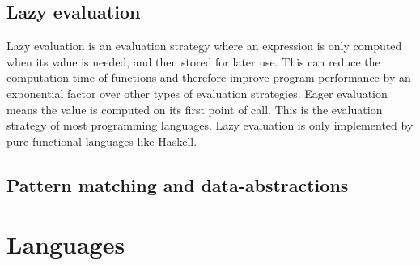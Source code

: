 \subsection{Lazy evaluation}
Lazy evaluation is an evaluation strategy where an expression is only computed when its value is needed, and
then stored for later use. This can reduce the computation time of functions and therefore improve program
performance by an exponential factor over other types of evaluation strategies. Eager evaluation means the value is
computed on its first point of call. This is the evaluation strategy of most programming languages. Lazy evaluation is
only implemented by pure functional languages like Haskell.\cite{languagedesign}

\subsection{Pattern matching and data-abstractions}

\section{Languages}


